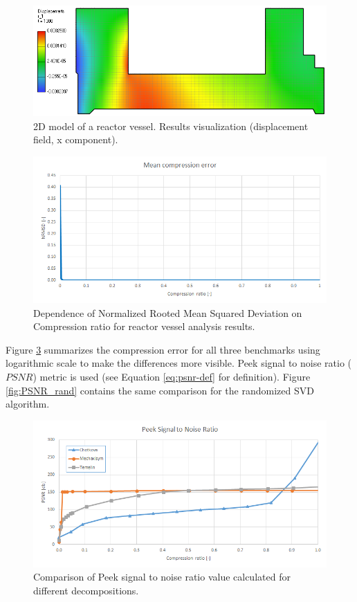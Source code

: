 \begin{figure}[H]
\centering\includegraphics[width=\textwidth]{figures/mechaxisym_screenshot}
\caption{2D model of a reactor vessel. Results visualization (displacement field, x component).}
\label{fig:mechaxisym:mesh}
\end{figure}

\begin{figure}[H]
\centering\includegraphics[width=\textwidth]{figures/mechaxisym_NRMSD}
\caption{Dependence of Normalized Rooted Mean Squared Deviation on Compression ratio for reactor vessel analysis results.}
\label{fig:mechaxisym:NRMSD}
\end{figure}

Figure \ref{fig:PSNR} summarizes the compression error for all three benchmarks using logarithmic scale to make the differences more visible. Peek signal to noise ratio ($\mathit{PSNR}$) metric is used (see Equation \ref{eq:psnr-def} for definition). Figure \ref{fig:PSNR_rand} contains the same comparison for the randomized SVD algorithm.

\begin{figure}[H]
\centering\includegraphics[width=\textwidth]{figures/PSNR}
\caption{Comparison of Peek signal to noise ratio value calculated for different decompositions.}
\label{fig:PSNR}
\end{figure}

